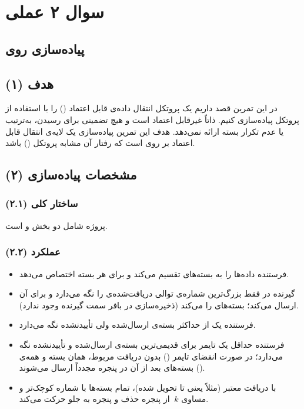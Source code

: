 \section*{سوال ۲ عملی}

\subsection*{پیاده‌سازی  روی }

\subsection*{(۱) هدف}
در این تمرین قصد داریم یک پروتکل انتقال داده‌ی قابل اعتماد () را با استفاده از پروتکل  پیاده‌سازی کنیم.  ذاتاً غیرقابل اعتماد است و هیچ تضمینی برای رسیدن، به‌ترتیب یا عدم تکرار بسته ارائه نمی‌دهد. هدف این تمرین پیاده‌سازی یک لایه‌ی انتقال قابل اعتماد بر روی  است که رفتار آن مشابه پروتکل  () باشد.

\subsection*{(۲) مشخصات پیاده‌سازی}

\subsubsection*{(۲.۱) ساختار کلی}
پروژه شامل دو بخش  و  است.

\subsubsection*{(۲.۲) عملکرد}
\begin{itemize}
  \item فرستنده داده‌ها را به بسته‌های  تقسیم می‌کند و برای هر بسته  اختصاص می‌دهد.
  \item گیرنده در  فقط بزرگ‌ترین شماره‌ی توالی دریافت‌شده‌ی  را نگه می‌دارد و برای آن  ارسال می‌کند؛ بسته‌های  را  می‌کند (ذخیره‌سازی در بافر سمت گیرنده وجود ندارد).
  \item فرستنده یک  از حداکثر  بسته‌ی ارسال‌شده ولی تأییدنشده نگه می‌دارد.
  \item فرستنده حداقل یک تایمر برای قدیمی‌ترین بسته‌ی ارسال‌شده و تأییدنشده نگه می‌دارد؛ در صورت انقضای تایمر () بدون دریافت  مربوط، همان بسته و همه‌ی بسته‌های بعد از آن در پنجره مجدداً ارسال می‌شوند ().
\item با دریافت  معتبر (مثلاً  یعنی تا  تحویل  شده)، تمام بسته‌ها با شماره کوچک‌تر و مساوی \(\ k\) از پنجره حذف و پنجره به جلو حرکت می‌کند.
\end{itemize}

